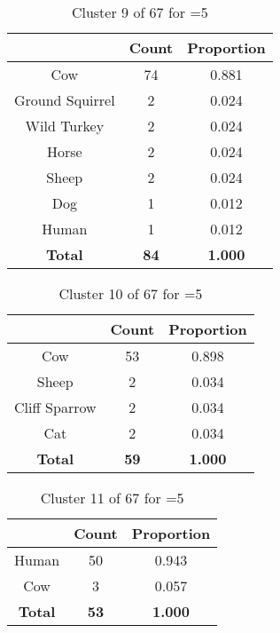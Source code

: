 \begin{table}[ht!]
\centering
\begin{tabular}{|c|c|c|}
\hline
\bf \Spec{} &\bf Count &\bf Proportion\\ \hline \hline
Cow & 74 & 0.881\\ \hline
Ground Squirrel & 2 & 0.024\\ \hline
Wild Turkey & 2 & 0.024\\ \hline
Horse & 2 & 0.024\\ \hline
Sheep & 2 & 0.024\\ \hline
Dog & 1 & 0.012\\ \hline
Human & 1 & 0.012\\ \hline
\hline
\bf Total & \bf 84 & \bf 1.000\\ \hline
\end{tabular}
\label{tab:cluster:9:5}
\caption{Cluster 9 of 67 for \minneigh{}=5}
\end{table}

\clearpage
\begin{table}[ht!]
\centering
\begin{tabular}{|c|c|c|}
\hline
\bf \Spec{} &\bf Count &\bf Proportion\\ \hline \hline
Cow & 53 & 0.898\\ \hline
Sheep & 2 & 0.034\\ \hline
Cliff Sparrow & 2 & 0.034\\ \hline
Cat & 2 & 0.034\\ \hline
\hline
\bf Total & \bf 59 & \bf 1.000\\ \hline
\end{tabular}
\label{tab:cluster:10:5}
\caption{Cluster 10 of 67 for \minneigh{}=5}
\end{table}

\begin{table}[ht!]
\centering
\begin{tabular}{|c|c|c|}
\hline
\bf \Spec{} &\bf Count &\bf Proportion\\ \hline \hline
Human & 50 & 0.943\\ \hline
Cow & 3 & 0.057\\ \hline
\hline
\bf Total & \bf 53 & \bf 1.000\\ \hline
\end{tabular}
\label{tab:cluster:11:5}
\caption{Cluster 11 of 67 for \minneigh{}=5}
\end{table}


